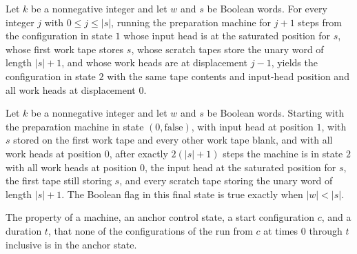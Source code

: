 \begin{lemma}
\label{Turing.FinTM.splitPrepare_rewind}
\leanok
{}
Let $k$ be a nonnegative integer and let $w$ and $s$ be Boolean words. For every integer
$j$ with $0\le j\le |s|$, running the preparation machine for $j+1$ steps from the
configuration in state $1$ whose input head is at the saturated position for $s$, whose
first work tape stores $s$, whose scratch tapes store the unary word of length $|s|+1$,
and whose work heads are at displacement $j-1$, yields the configuration in state $2$
with the same tape contents and input-head position and all work heads at displacement
$0$.
\end{lemma}

\begin{lemma}
\label{Turing.FinTM.splitPrepare_run}
\leanok
{}
Let $k$ be a nonnegative integer and let $w$ and $s$ be Boolean words. Starting with the
preparation machine in state $(0,\mathrm{false})$, with input head at position $1$, with
$s$ stored on the first work tape and every other work tape blank, and with all work
heads at position $0$, after exactly $2(|s|+1)$ steps the machine is in state $2$ with
all work heads at position $0$, the input head at the saturated position for $s$, the
first tape still storing $s$, and every scratch tape storing the unary word of length
$|s|+1$. The Boolean flag in this final state is true exactly when $|w|<|s|$.
\end{lemma}

\begin{definition}
\label{Turing.FinTM.splitSafe}
\leanok
{}
The property of a machine, an anchor control state, a start configuration
$c$, and a duration $t$, that none of the configurations of the run from $c$
at times $0$ through $t$ inclusive is in the anchor state.
\end{definition}

